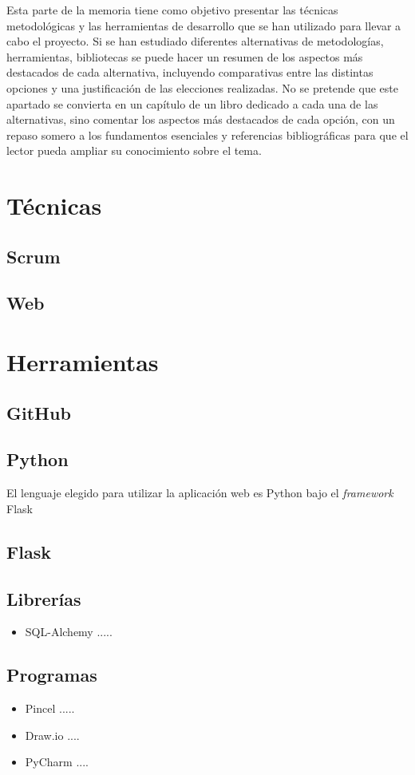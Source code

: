 
Esta parte de la memoria tiene como objetivo presentar las técnicas metodológicas y las herramientas de desarrollo que se han utilizado para llevar a cabo el proyecto. Si se han estudiado diferentes alternativas de metodologías, herramientas, bibliotecas se puede hacer un resumen de los aspectos más destacados de cada alternativa, incluyendo comparativas entre las distintas opciones y una justificación de las elecciones realizadas. 
No se pretende que este apartado se convierta en un capítulo de un libro dedicado a cada una de las alternativas, sino comentar los aspectos más destacados de cada opción, con un repaso somero a los fundamentos esenciales y referencias bibliográficas para que el lector pueda ampliar su conocimiento sobre el tema.

\section{Técnicas}
\subsection{Scrum}
\subsection{Web}
\section{Herramientas}
\subsection{GitHub}
\subsection{Python}
El lenguaje elegido para utilizar la aplicación web es Python bajo el \textit{framework} Flask
\subsection{Flask}
\subsection{Librerías}
\begin{itemize}
\item SQL-Alchemy
.....
\end{itemize}

\subsection{Programas}
\begin{itemize}
\item Pincel
.....
\item Draw.io
....
\item PyCharm
....
\end{itemize}
\subsection{}

